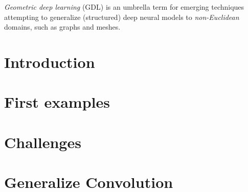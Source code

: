
\emph{Geometric deep learning} (GDL) is an umbrella term for emerging techniques attempting to generalize (structured) deep neural models to \emph{non-Euclidean} domains, such as graphs and meshes.

\section{Introduction} 

\section{First examples} 

\section{Challenges} 

\section{Generalize Convolution} 



